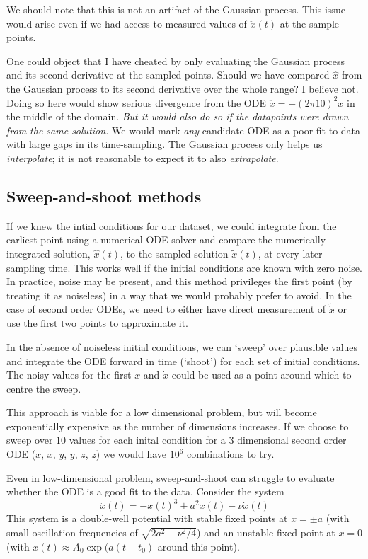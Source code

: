\documentclass{article}
\begin{document}
We should note that this is not an artifact of the Gaussian process.
This issue would arise even if we had access to measured values of $\ddot{x}(t)$ at the sample points.

One could object that I have cheated by only evaluating the Gaussian process and its second derivative at the sampled points.
Should we have compared $\hat{x}$ from the Gaussian process to its second derivative over the whole range?
I believe not.
Doing so here would show serious divergence from the ODE $\ddot{x} = -(2\pi10)^2 x$ in the middle of the domain.
\emph{But it would also do so if the datapoints were drawn from the same solution.}
We would mark \emph{any} candidate ODE as a poor fit to data with large gaps in its time-sampling.
The Gaussian process only helps us \emph{interpolate}; it is not reasonable to expect it to also \emph{extrapolate}.

\subsection{Sweep-and-shoot methods}
\label{sec:sweep_and_shoot}

If we knew the intial conditions for our dataset, we could integrate from the earliest point using a numerical ODE solver and compare the numerically integrated solution, $\hat{x}(t)$, to the sampled solution $\tilde{x}(t)$, at every later sampling time.
This works well if the initial conditions are known with zero noise.
In practice, noise may be present, and this method privileges the first point (by treating it as noiseless) in a way that we would probably prefer to avoid.
In the case of second order ODEs, we need to either have direct measurement of $\tilde{\dot{x}}$ or use the first two points to approximate it.

In the absence of noiseless initial conditions, we can `sweep' over plausible values and integrate the ODE forward in time (`shoot') for each set of initial conditions.
The noisy values for the first $x$ and $\dot{x}$ could be used as a point around which to centre the sweep.

This approach is viable for a low dimensional problem, but will become exponentially expensive as the number of dimensions increases.
If we choose to sweep over $10$ values for each inital condition for a 3 dimensional second order ODE ($x$, $\dot{x}$, $y$, $\dot{y}$, $z$, $\dot{z}$) we would have $10^6$ combinations to try.

Even in low-dimensional problem, sweep-and-shoot can struggle to evaluate whether the ODE is a good fit to the data. Consider the system
$$
\ddot{x}(t) = - x(t)^3 + a^2 x(t) - \nu \dot{x}(t)
$$
This system is a double-well potential with stable fixed points at $x = \pm a$ (with small oscillation frequencies of $\sqrt{2 a^2 - \nu^2/4}$) and an unstable fixed point at $x=0$ (with $x(t) \approx A_0 \exp(a (t - t_0)$ around this point).
\end{document}
